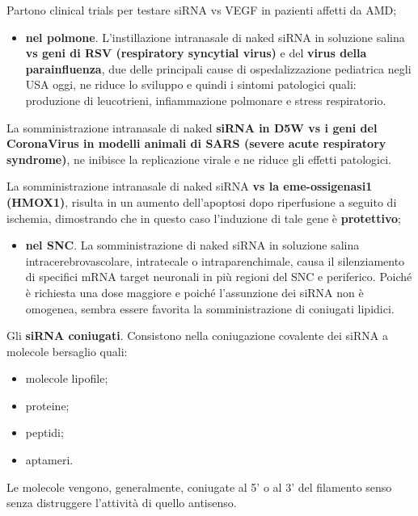 \documentclass[]{article}
\begin{document}
Partono clinical trials per testare siRNA vs VEGF in pazienti affetti da
AMD;

\begin{itemize}
\itemsep1pt\parskip0pt
\item
  \textbf{nel polmone}. L'instillazione intranasale di naked siRNA in
  soluzione salina \textbf{vs geni di RSV (respiratory syncytial virus)}
  e del \textbf{virus della parainfluenza}, due delle principali cause
  di ospedalizzazione pediatrica negli USA oggi, ne riduce lo sviluppo e
  quindi i sintomi patologici quali: produzione di leucotrieni,
  infiammazione polmonare e stress respiratorio.
\end{itemize}

La somministrazione intranasale di naked \textbf{siRNA in D5W vs i geni
del CoronaVirus in modelli animali di SARS (severe acute respiratory
syndrome)}, ne inibisce la replicazione virale e ne riduce gli effetti
patologici.

La somministrazione intranasale di naked siRNA \textbf{vs la
eme-ossigenasi1 (HMOX1)}, risulta in un aumento dell'apoptosi dopo
riperfusione a seguito di ischemia, dimostrando che in questo caso
l'induzione di tale gene è \textbf{protettivo};

\begin{itemize}
\itemsep1pt\parskip0pt
\item
  \textbf{nel SNC}. La somministrazione di naked siRNA in soluzione
  salina intracerebrovascolare, intratecale o intraparenchimale, causa
  il silenziamento di specifici mRNA target neuronali in più regioni del
  SNC e periferico. Poiché è richiesta una dose maggiore e poiché
  l'assunzione dei siRNA non è omogenea, sembra essere favorita la
  somministrazione di coniugati lipidici.
\end{itemize}

Gli \textbf{siRNA coniugati}. Consistono nella coniugazione covalente
dei siRNA a molecole bersaglio quali:

\begin{itemize}
\itemsep1pt\parskip0pt
\item
  molecole lipofile;
\item
  proteine;
\item
  peptidi;
\item
  aptameri.
\end{itemize}

Le molecole vengono, generalmente, coniugate al 5' o al 3' del filamento
senso senza distruggere l'attività di quello antisenso.
\end{document}

